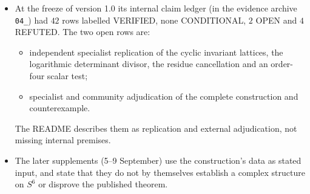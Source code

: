 \begin{itemize}
\item At the freeze of version 1.0 its internal claim ledger (in the evidence archive \texttt{04\_}) had $42$ rows labelled \textsf{VERIFIED}, none \textsf{CONDITIONAL}, $2$ \textsf{OPEN} and $4$ \textsf{REFUTED}. The two open rows are:
\begin{itemize}
\item independent specialist replication of the cyclic invariant lattices, the logarithmic determinant divisor, the residue cancellation and an order-four scalar test;
\item specialist and community adjudication of the complete construction and counterexample.
\end{itemize}
The README describes them as replication and external adjudication, not missing internal premises.
\item The later supplements (5--9 September) use the construction's data as stated input, and state that they do not by themselves establish a complex structure on $S^6$ or disprove the published theorem.
\end{itemize}
